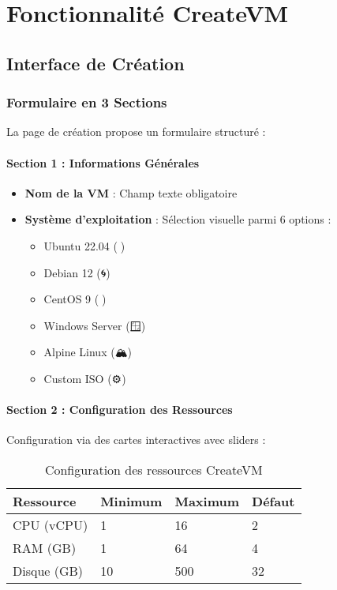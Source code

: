 \documentclass[12pt,a4paper]{report}
\begin{document}
\chapter{Fonctionnalité CreateVM}

\section{Interface de Création}

\subsection{Formulaire en 3 Sections}

La page de création propose un formulaire structuré :

\subsubsection{Section 1 : Informations Générales}

\begin{itemize}
    \item \textbf{Nom de la VM} : Champ texte obligatoire
    \item \textbf{Système d'exploitation} : Sélection visuelle parmi 6 options :
    \begin{itemize}
        \item Ubuntu 22.04 (🐧)
        \item Debian 12 (🌀)
        \item CentOS 9 (🔴)
        \item Windows Server (🪟)
        \item Alpine Linux (🏔️)
        \item Custom ISO (⚙️)
    \end{itemize}
\end{itemize}

\subsubsection{Section 2 : Configuration des Ressources}

Configuration via des cartes interactives avec sliders :

\begin{table}[H]
\centering
\begin{tabular}{@{}llll@{}}
\toprule
\textbf{Ressource} & \textbf{Minimum} & \textbf{Maximum} & \textbf{Défaut} \\ \midrule
CPU (vCPU) & 1 & 16 & 2 \\
RAM (GB) & 1 & 64 & 4 \\
Disque (GB) & 10 & 500 & 32 \\ \bottomrule
\end{tabular}
\caption{Configuration des ressources CreateVM}
\end{table}
\end{document}
